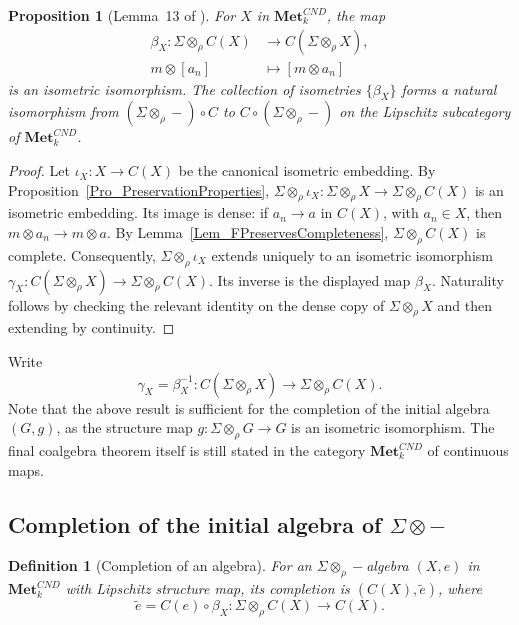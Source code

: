 \documentclass{sn-jnl}%
\theoremstyle{thmstyleone}%
\newtheorem{proposition}[theorem]{Proposition}%
\theoremstyle{thmstyletwo}%
\theoremstyle{thmstylethree}%
\newtheorem{definition}{Definition}%
\newcommand{\mcnd}{\mathbf{Met}_{k}^{CND}}
\newcommand{\M}{\Sigma}
\newcommand{\F}{\M\otimes}
\newcommand{\Fw}{\M\otimes_{\w}}
\newcommand{\w}{\rho}
\begin{document}
\begin{proposition}[Lemma~13 of \cite{Bhat}]
\label{prop_BetaIsNatural}
    For $X$ in $\mcnd$, the map 
    \begin{equation}
    \label{Def_beta}
    \begin{aligned}
        \beta_X:\Fw C(X)  &  \longrightarrow C(\Fw X),\\
        m\otimes[a_n]     &  \longmapsto[m\otimes a_n]
    \end{aligned}
    \end{equation}
    is an isometric isomorphism. The collection of isometries $\{\beta_X\}$ forms a natural isomorphism from $(\Fw-)\circ C$ to $ C\circ(\Fw-)$ on the Lipschitz subcategory of $\mcnd$.
\end{proposition}

\begin{proof}
Let $\iota_X:X\to C(X)$ be the canonical isometric embedding. By Proposition~\ref{Pro_PreservationProperties}, $\Fw\iota_X:\Fw X\to\Fw C(X)$ is an isometric embedding. Its image is dense: if $a_n\to a$ in $C(X)$, with $a_n\in X$, then $m\otimes a_n\to m\otimes a$. By Lemma~\ref{Lem_FPreservesCompleteness}, $\Fw C(X)$ is complete. Consequently, $\Fw\iota_X$ extends uniquely to an isometric isomorphism $\gamma_X:C(\Fw X)\to\Fw C(X)$. Its inverse is the displayed map $\beta_X$. Naturality follows by checking the relevant identity on the dense copy of $\Fw X$ and then extending by continuity.
\end{proof}


Write 
\begin{equation}
\nonumber
    \gamma_X=\beta_X^{-1}:C(\Fw X)\to\Fw C(X).
\end{equation}
Note that the above result is sufficient for the completion of the initial algebra $(G,g)$, as the structure map $g:\Fw G\rightarrow G$ is an isometric isomorphism.  The final coalgebra theorem itself is still stated in the category $\mcnd$ of continuous maps.

\subsection{Completion of the initial algebra of $\F-$}
\label{Sec_CompletionOfTheInitialAlgebra}

\begin{definition}[Completion of an algebra]
\label{Def_CompletionOfAlgebra}
For an $\Fw-$algebra $(X,e)$ in $\mcnd$ with Lipschitz structure map, its completion is $(C(X),\tilde e)$, where
\begin{equation} 
\nonumber
    \tilde e=C(e)\circ\beta_X:\Fw C(X)\longrightarrow C(X).
\end{equation}
\end{definition}
\end{document}
